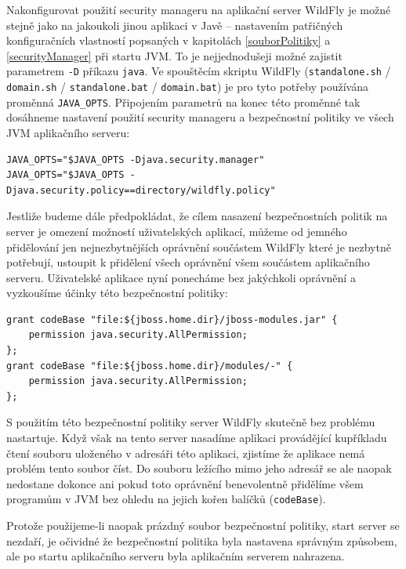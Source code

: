Nakonfigurovat použití security manageru na aplikační server WildFly je možné stejně jako na jakoukoli jinou aplikaci v Javě -- nastavením patřičných konfiguračních vlastností popsaných v kapitolách \ref{souborPolitiky} a \ref{securityManager} při startu JVM. To je nejjednodušeji možné zajistit parametrem {\tt -D} příkazu {\tt java}. Ve spouštěcím skriptu WildFly ({\tt standalone.sh} / {\tt domain.sh} / {\tt standalone.bat} / {\tt domain.bat}) je pro tyto potřeby používána proměnná {\tt JAVA\_OPTS}. Připojením parametrů na konec této proměnné tak dosáhneme nastavení použití security manageru a bezpečnostní politiky ve všech JVM aplikačního serveru: \cite{jbossSecurityManager}

\begin{verbatim}
JAVA_OPTS="$JAVA_OPTS -Djava.security.manager"
JAVA_OPTS="$JAVA_OPTS -Djava.security.policy==directory/wildfly.policy"
\end{verbatim}

Jestliže budeme dále předpokládat, že cílem nasazení bezpečnostních politik na server je omezení možností uživatelských aplikací, můžeme od jemného přidělování jen nejnezbytnějších oprávnění součástem WildFly které je nezbytně potřebují, ustoupit k přidělení všech oprávnění všem součástem aplikačního serveru. Uživatelské aplikace nyní ponecháme bez jakýchkoli oprávnění a vyzkoušíme účinky této bezpečnostní politiky:

\begin{verbatim}
grant codeBase "file:${jboss.home.dir}/jboss-modules.jar" {
    permission java.security.AllPermission;
};
grant codeBase "file:${jboss.home.dir}/modules/-" {
    permission java.security.AllPermission;
};
\end{verbatim}

S použitím této bezpečnostní politiky server WildFly skutečně bez problému nastartuje. Když však na tento server nasadíme aplikaci provádějící kupříkladu čtení souboru uloženého v adresáři této aplikaci, zjistíme že aplikace nemá problém tento soubor číst. Do souboru ležícího mimo jeho adresář se ale naopak nedostane dokonce ani pokud toto oprávnění benevolentně přidělíme všem programům v JVM bez ohledu na jejich kořen balíčků ({\tt codeBase}).

Protože použijeme-li naopak prázdný soubor bezpečnostní politiky, start server se nezdaří, je očividné že bezpečnostní politika byla nastavena správným způsobem, ale po startu aplikačního serveru byla aplikačním serverem nahrazena.


